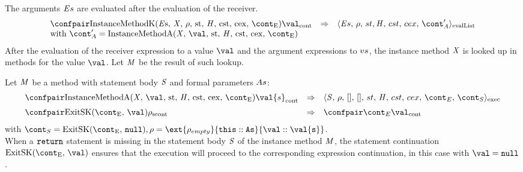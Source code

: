 \documentclass{article}
\begin{document}
\noindent
The arguments $\mathit{E}{s}$ are evaluated after the evaluation of the receiver.
\newcommand{\InstanceMethodInvocationArgsApp}{\mathrm{InstanceMethodA(\idmeta,\,\val,\,\strace,\,\handler,\,\cstrace,\,\cex,\,\econt)}}
\[
  \begin{array}{lcl}
	\cesktrans{
		\contconf{\InstanceMethodK}{\val}}{
		\evallistconf{\expressionsmeta}{\env}{\strace}{\cstrace}{\cex}{\acont'}}
	\\
	\textrm{with } \acont' = \InstanceMethodInvocationArgsApp
  \end{array}
\]
\noindent
After the evaluation of the receiver expression to a value $\val$ and the argument expressions to $vs$, the instance method $\mathit{X}$ is looked up in methods for the value $\val$. Let $\mathit{M}$ be the result of such lookup.

\noindent
Let $\mathit{M}$ be a method with statement body $\mathit{S}$ and formal parameters $As$:
\[
  \begin{array}{lcl}
	\cesktrans{
		\contconf{\InstanceMethodInvocationArgsApp}{\val{s}}}{
		\execconf{\stmt}{\env}{[]}{[]}{\handler}{\cstrace}{\cex}{\econt}{\scont}}
	\\[2mm]
	\cesktrans{
		\scontconf{\ExitSK{\val}}{\env}}{
		\contconf{\econt}{\val}}
  \end{array}
\]
with $\scont = \ExitSK{\tt{null}}, \env = \ext{\env_{empty}}{\this :: \formals}{\val :: \val{s}}$.\\[2mm]

\noindent
When a $\tt{return}$ statement is missing in the statement body $\mathit{S}$ of the instance method $\mathit{M}$, the statement continuation $\ExitSK{\val}$ ensures that the execution will proceed to the corresponding expression continuation, in this case with $\val = \tt{null}$.
\end{document}
